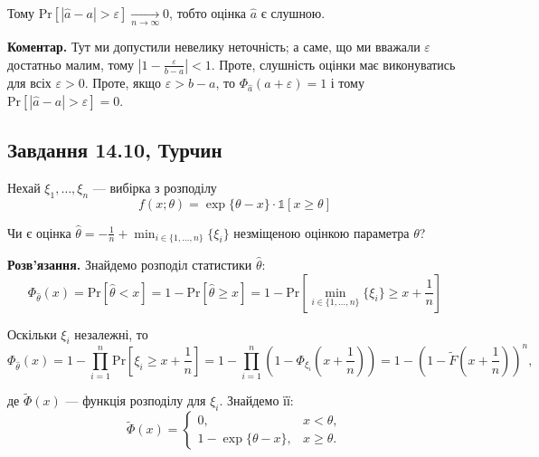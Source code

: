 \documentclass{hw_template}
\begin{document}
Тому $\text{Pr}[|\hat{a} - a| > \varepsilon] \xrightarrow[n \to \infty]{} 0$, тобто оцінка $\hat{a}$ є слушною.

\textbf{Коментар.} Тут ми допустили невелику неточність; а саме, що ми вважали $\varepsilon$ достатньо малим, тому $\left|1-\frac{\varepsilon}{b-a}\right| < 1$. Проте, слушність оцінки має виконуватись для всіх $\varepsilon > 0$. Проте, якщо $\varepsilon > b-a$, то $\Phi_{\hat{a}}(a+\varepsilon) = 1$ і тому $\text{Pr}[|\hat{a} - a| > \varepsilon] = 0$. 

\pagebreak
\subsection{Завдання 14.10, Турчин}

\begin{problem}
    Нехай $\xi_1,\dots,\xi_n$ --- вибірка з розподілу
    \begin{equation*}
        f(x;\theta) = \exp \{\theta - x\} \cdot \mathds{1}[x \geq \theta]
    \end{equation*}

    Чи є оцінка $\hat{\theta} = -\frac{1}{n} + \min_{i \in \{1,\dots,n\}}\{\xi_i\}$ незміщеною оцінкою параметра $\theta$?
\end{problem}

\textbf{Розв'язання.} Знайдемо розподіл статистики $\hat{\theta}$:
\begin{equation*}
    \Phi_{\hat{\theta}}(x) = \text{Pr}[\hat{\theta} < x] = 1 - \text{Pr}[\hat{\theta} \geq x] = 1 - \text{Pr}\left[\min_{i \in \{1,\dots,n\}}\{\xi_i\} \geq x + \frac{1}{n}\right]
\end{equation*}

Оскільки $\xi_i$ незалежні, то
\begin{equation*}
    \Phi_{\hat{\theta}}(x) = 1 - \prod_{i=1}^n \text{Pr}\left[\xi_i \geq x + \frac{1}{n}\right] = 1 - \prod_{i=1}^n \left(1 - \Phi_{\xi_i}\left(x + \frac{1}{n}\right)\right) = 1 - \left(1 - \widetilde{F}\left(x + \frac{1}{n}\right)\right)^n,
\end{equation*}

де $\widetilde{\Phi}(x)$ --- функція розподілу для $\xi_i$. Знайдемо її:
\begin{equation*}
    \widetilde{\Phi}(x) = 
    \begin{cases}
        0, & x < \theta, \\
        1 - \exp\{\theta - x\}, & x \geq \theta.
    \end{cases}
\end{equation*}
\end{document}
